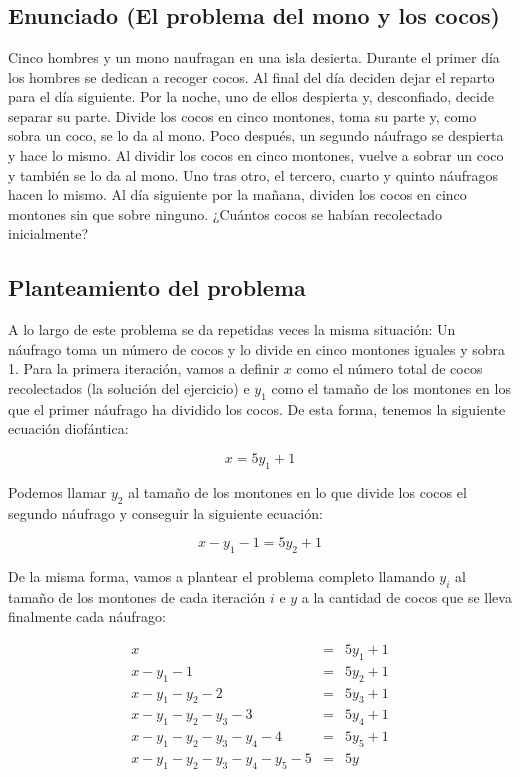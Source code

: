 \section{}\label{ej-1-3}

\subsection*{Enunciado (El problema del mono y los cocos)}

Cinco hombres y un mono naufragan en una isla desierta.
Durante el primer día los hombres se dedican a recoger cocos.
Al final del día deciden dejar el reparto para el día siguiente.
Por la noche, uno de ellos despierta y, desconfiado, decide separar su parte.
Divide los cocos en cinco montones, toma su parte y, como sobra un coco, se lo da al mono.
Poco después, un segundo náufrago se despierta y hace lo mismo.
Al dividir los cocos en cinco montones, vuelve a sobrar un coco y también se lo da al mono.
Uno tras otro, el tercero, cuarto y quinto náufragos hacen lo mismo.
Al día siguiente por la mañana, dividen los cocos en cinco montones sin que sobre ninguno.
¿Cuántos cocos se habían recolectado inicialmente?

\subsection*{Planteamiento del problema}

A lo largo de este problema se da repetidas veces la misma situación: Un náufrago toma un número de cocos y lo divide en cinco montones iguales y sobra 1.
Para la primera iteración, vamos a definir $x$ como el número total de cocos recolectados (la solución del ejercicio) e $y_1$ como el tamaño de los montones en los que el primer náufrago ha dividido los cocos.
De esta forma, tenemos la siguiente ecuación diofántica:

\[x = 5y_1 + 1\]

Podemos llamar $y_2$ al tamaño de los montones en lo que divide los cocos el segundo náufrago y conseguir la siguiente ecuación:

\[x - y_1 - 1 = 5y_2 + 1\]

De la misma forma, vamos a plantear el problema completo llamando $y_i$ al tamaño de los montones de cada iteración $i$ e $y$ a la cantidad de cocos que se lleva finalmente cada náufrago:

\[
\begin{array}{rcl}
	x                                   & = & 5y_1 + 1 \\
	x - y_1 - 1                         & = & 5y_2 + 1 \\
	x - y_1 - y_2 - 2                   & = & 5y_3 + 1 \\
	x - y_1 - y_2 - y_3 - 3             & = & 5y_4 + 1 \\
	x - y_1 - y_2 - y_3 - y_4 - 4       & = & 5y_5 + 1 \\
	x - y_1 - y_2 - y_3 - y_4 - y_5 - 5 & = & 5y
\end{array}
\]

